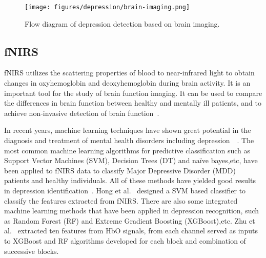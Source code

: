 \begin{figure}[tbp]
	\centering	
	\label{fig_hard_case1}\texttt{[image: figures/depression/brain-imaging.png]}		
	\caption{
	Flow diagram of depression detection based on brain imaging.
	}
	\label{brain-imaging}
\end{figure}

\subsection{fNIRS}
\label{sec_fquality}
fNIRS utilizes the scattering properties of blood to near-infrared light to obtain changes in oxyhemoglobin and deoxyhemoglobin during brain activity.
It is an important tool for the study of brain function imaging. It can be used to compare the differences in brain function between healthy and mentally ill patients, and to achieve non-invasive detection of brain function~\cite{2018Reduced,2019Brain,2014Relationship,2016Correlation,2019The}.

In recent years, machine learning techniques have shown great potential in the diagnosis and treatment of mental health disorders including depression~\cite{2019Machine}~\cite{2017Machine}. 
The most common machine learning algorithms for predictive classification such as Support Vector Machines (SVM), Decision Trees (DT) and naïve bayes,etc, have been applied to fNIRS data to classify Major Depressive Disorder (MDD) patients and healthy individuals. All of these methods have yielded good results in depression identification~\cite{2017Automatic}. 
Hong et al.~\cite{2015Automatic} designed a SVM based classifier to classify the features extracted from fNIRS.
There are also some integrated machine learning methods that have been applied in depression recognition, such as Random Forest (RF) and Extreme Gradient Boosting (XGBoost),etc. Zhu et al.~\cite{2020Classifying} extracted ten features from HbO signals, from each channel served as inputs to XGBoost and RF algorithms developed for each block and combination of successive blocks.


